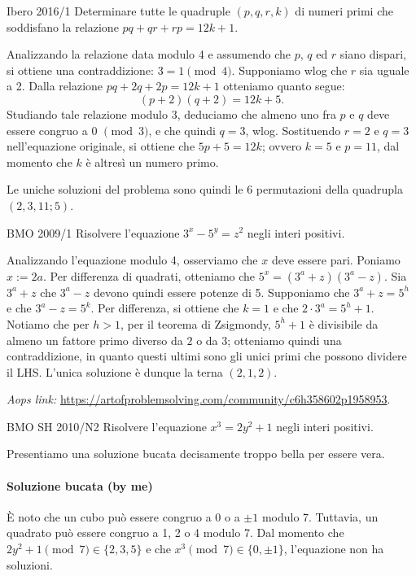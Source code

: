 \documentclass{article}
\begin{document}
\begin{proposition}{Ibero 2016/1}{}
	Determinare tutte le quadruple $(p,q,r,k)$ di numeri primi
	che soddisfano la relazione $pq+qr+rp=12k+1$.
\end{proposition}

Analizzando la relazione data modulo 4 e assumendo
che $p$, $q$ ed $r$ siano dispari, si ottiene una contraddizione:
$3=1 \pmod{4}$. Supponiamo wlog che $r$ sia uguale a 2.
Dalla relazione $pq+2q+2p=12k+1$ otteniamo quanto segue:
\begin{equation*}
	(p+2)(q+2)=12k+5.
\end{equation*}
Studiando tale relazione modulo 3, deduciamo che almeno uno fra
$p$ e $q$ deve essere congruo a 0 $\pmod{3}$, e che quindi
$q=3$, wlog.
Sostituendo $r=2$ e $q=3$ nell'equazione originale, si ottiene
che $5p+5=12k$; ovvero $k=5$ e $p=11$, dal momento che $k$ è
altresì un numero primo.

Le uniche soluzioni del problema sono quindi le
6 permutazioni della quadrupla $(2, 3, 11; 5)$.

\begin{proposition}{BMO 2009/1}{}
	Risolvere l'equazione $3^x-5^y=z^2$ negli interi positivi.
\end{proposition}

Analizzando l'equazione modulo 4, osserviamo che $x$ deve essere pari.
Poniamo $x:=2a$. Per differenza di quadrati, otteniamo che
$5^x=(3^a+z)(3^a-z)$. Sia $3^a+z$ che $3^a-z$ devono quindi essere
potenze di 5. Supponiamo che $3^a+z=5^h$ e che $3^a-z=5^k$.
Per differenza, si ottiene che $k=1$ e che $2\cdot 3^a=5^h+1$. Notiamo che
per $h>1$,
per il teorema di Zsigmondy, $5^h+1$ è divisibile da almeno un fattore primo
diverso da $2$ o da $3$; otteniamo quindi una contraddizione, in quanto
questi ultimi sono gli unici primi che possono dividere il LHS.
L'unica soluzione è dunque la terna $(2,1,2)$.

\vspace{0.5cm}
\textit{Aops link:}
\href{https://artofproblemsolving.com/community/c6h358602p1958953}
{https://artofproblemsolving.com/community/c6h358602p1958953}.

\begin{proposition}{BMO SH 2010/N2}{}
	Risolvere l'equazione $x^3=2y^2+1$ negli interi positivi.
\end{proposition}
Presentiamo una soluzione bucata decisamente troppo bella per essere vera.

\paragraph{Soluzione bucata (by me)}
È noto che un cubo può essere congruo a $0$ o a $\pm 1$ modulo 7.
Tuttavia, un quadrato può essere congruo a 1, 2 o 4 modulo 7.
Dal momento che $2y^2+1 \pmod{7} \in \{2,3,5 \}$ e che
$x^3 \pmod{7} \in \{ 0,\pm 1\}$, l'equazione non ha soluzioni.
\end{document}
